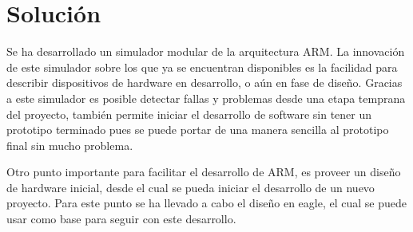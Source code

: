 \section{Soluci\'on}

Se ha desarrollado un simulador modular de la arquitectura ARM. La innovación de este simulador sobre los que ya se encuentran disponibles es la facilidad para describir dispositivos de hardware en desarrollo, o aún en fase de diseño. Gracias a este simulador es posible detectar fallas y problemas desde una etapa temprana del proyecto, también permite iniciar el desarrollo de software sin tener un prototipo terminado pues se puede portar de una manera sencilla al prototipo final sin mucho problema.

Otro punto importante para facilitar el desarrollo de ARM, es proveer un diseño de hardware inicial, desde el cual se pueda iniciar el desarrollo de un nuevo proyecto. Para este punto se ha llevado a cabo el diseño en eagle, el cual se puede usar como base para seguir con este desarrollo.

